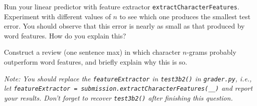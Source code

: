\item {}

Run your linear predictor with feature extractor {\tt extractCharacterFeatures}.
Experiment with different values of $n$ to see which one produces the smallest
test error.  You should observe that this error is nearly as small as that
produced by word features.  How do you explain this?

Construct a review (one sentence max) in which character $n$-grams probably
outperform word features, and briefly explain why this is so.

{\em Note: You should replace the {\tt featureExtractor} in {\tt test3b2()} in
{\tt grader.py}, i.e., let {\tt featureExtractor =
submission.extractCharacterFeatures(\_\_)} and report your results. Don't forget
to recover {\tt test3b2()} after finishing this question.}
